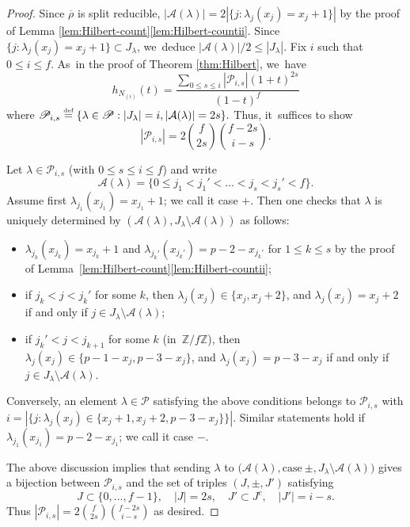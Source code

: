 \documentclass[JEP,XML,SOM,Unicode,NoFloatCountersInSection, NoEqCountersInSection,published]{cedram}
\newcommand{\defeq}{\stackrel{\textrm{\tiny{\upshape{def}}}}{=}}
\newcommand{\Z}{{\mathbb Z}}
\renewcommand{\P}{\mathscr P}
\newcommand{\brho}{\overline{\rho}}
\theoremstyle{plain}
\theoremstyle{definition}
\begin{document}
\begin{proof}
Since $\brho$ is split reducible, $|\mathcal{A}(\lambda)|=2|\{j:\lambda_j(x_j)=x_j+1\}|$ by the proof of Lemma \ref{lem:Hilbert-count}\eqref{lem:Hilbert-countii}. Since $\{j:\lambda_j(x_j)=x_j+1\}\subset J_{\lambda}$, we~deduce $|\mathcal{A}(\lambda)|/2\leq |J_{\lambda}|$. Fix $i$ such that $0\leq i\leq f$. As~in the proof of Theorem \ref{thm:Hilbert}, we~have
\[
h_{N_{(i)}}(t)=\frac{\sum_{0\leq s\leq i}|\P_{i,s}|(1+t)^{2s}}{(1-t)^f}
\]
where
$\P_{i,s}\defeq\{\lambda\in \P: |J_{\lambda}|=i, |\mathcal{A}(\lambda)|=2s\}.$ Thus, it~suffices to show
\[
|\P_{i,s}|=2\binom{f}{2s}\binom{f-2s}{i-s}.
\]

Let $\lambda\in \P_{i,s}$ (with $0\leq s\leq i\leq f$) and write
\[
\mathcal{A}(\lambda)=\{0 \le j_1 < j_1' < \dots < j_{s} < j_s' < f\}.
\]
Assume first $\lambda_{j_1}(x_{j_1})=x_{j_1}+1$; we call it case $+$. Then one checks that $\lambda$ is uniquely determined by $(\mathcal{A}(\lambda),J_{\lambda}\setminus \mathcal{A}(\lambda))$ as follows:
\begin{itemize}
\item
$\lambda_{j_k}(x_{j_k})=x_{j_k}+1$ and $\lambda_{j_k'}(x_{j_k'})=p-2-x_{j_k'}$ for $1\leq k\leq s$ by the proof of Lem\-ma~\ref{lem:Hilbert-count}\eqref{lem:Hilbert-countii};

\item
if $j_k<j<j_k'$ for some $k$, then $\lambda_j(x_j)\in \{x_j,x_j+2\}$, and $\lambda_j(x_j)=x_j+2$ if and only if $j\in J_{\lambda}\setminus \mathcal{A}(\lambda)$;
\item
if $j_k'<j<j_{k+1}$ for some $k$ (in~$\Z/f\Z$), then $\lambda_j(x_j)\in \{p-1-x_j,p-3-x_j\}$, and $\lambda_j(x_j)=p-3-x_j$ if and only if $j\in J_{\lambda}\setminus \mathcal{A}(\lambda)$.
\end{itemize}
Conversely, an element $\lambda\in\P$ satisfying the above conditions belongs to $\P_{i,s}$ with $i=|\{j:\lambda_j(x_j)\in\{x_j+1,x_j+2,p-3-x_j\}\}|$. Similar statements hold if $\lambda_{j_1}(x_{j_1})=p-2-x_{j_1}$; we call it case $-$.

The above discussion implies that sending $\lambda$ to $\bigl(\mathcal{A}(\lambda), \mathrm{case}\ \pm, J_{\lambda}\setminus \mathcal{A}(\lambda)
\bigr)$ gives a bijection between $\P_{i,s}$ and the set of triples $(J,\pm,J')$ satisfying
\[
J\subset \{0,\dots,f-1\},\quad |J|=2s,\quad J'\subset J^c,\quad |J'|=i-s.
\]
Thus $|\P_{i,s}|=2 \binom{f}{2s}\binom{f-2s}{i-s}$ as desired.
\end{proof}
\end{document}
